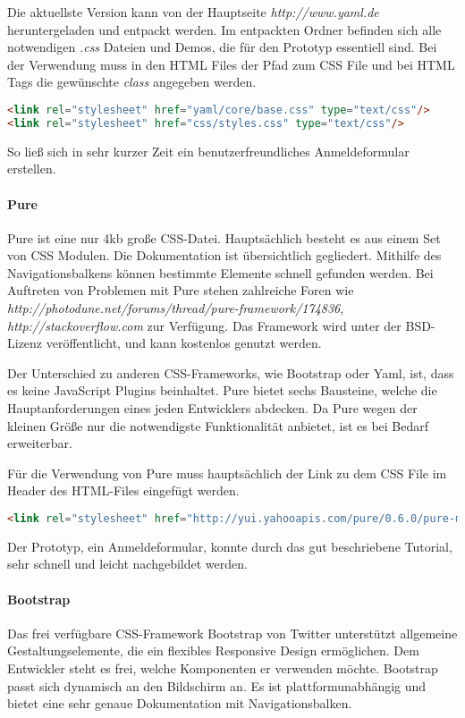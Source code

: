 Die aktuellste Version kann von der Hauptseite \textit{http://www.yaml.de} heruntergeladen und entpackt werden. Im entpackten Ordner befinden sich alle notwendigen \textit{.css} Dateien und Demos, die für den Prototyp essentiell sind. Bei der Verwendung muss in den HTML Files der Pfad zum CSS File und bei HTML Tags die gewünschte \textit{class} angegeben werden. 
\begin{lstlisting}[caption={YAML einbinden \cite{YAMLPROTO}}, language=HTML]
<link rel="stylesheet" href="yaml/core/base.css" type="text/css"/>
<link rel="stylesheet" href="css/styles.css" type="text/css"/>
\end{lstlisting}

So ließ sich in sehr kurzer Zeit ein benutzerfreundliches Anmeldeformular erstellen.

\paragraph{Pure}
Pure ist eine nur 4kb große CSS-Datei. Hauptsächlich besteht es aus einem Set von CSS Modulen. Die Dokumentation ist übersichtlich gegliedert. Mithilfe des Navigationsbalkens können bestimmte Elemente schnell gefunden werden. Bei Auftreten von Problemen mit Pure stehen zahlreiche Foren wie \textit{http://photodune.net/forums/thread/pure-framework/174836}, \textit{http://stackoverflow.com} zur Verfügung. Das Framework wird unter der BSD-Lizenz veröffentlicht, und kann kostenlos genutzt werden. \cite{BSD}

Der Unterschied zu anderen CSS-Frameworks, wie Bootstrap oder Yaml, ist, dass es keine JavaScript Plugins beinhaltet. Pure bietet sechs Bausteine, welche die Hauptanforderungen eines jeden Entwicklers abdecken. Da Pure wegen der kleinen Größe nur die notwendigste Funktionalität anbietet, ist es bei Bedarf erweiterbar.

Für die Verwendung von Pure muss hauptsächlich der Link zu dem CSS File im Header des HTML-Files eingefügt werden. \cite{PURE}
\begin{lstlisting}[caption={Pure einbinden \cite{PURE}}, language=HTML]
<link rel="stylesheet" href="http://yui.yahooapis.com/pure/0.6.0/pure-min.css">
\end{lstlisting}

Der Prototyp, ein Anmeldeformular, konnte durch das gut beschriebene Tutorial, sehr schnell und leicht nachgebildet werden.

\paragraph{Bootstrap}
Das frei verfügbare CSS-Framework Bootstrap von Twitter unterstützt allgemeine Gestaltungselemente, die ein flexibles Responsive Design ermöglichen. Dem Entwickler steht es frei, welche Komponenten er verwenden möchte. Bootstrap passt sich dynamisch an den Bildschirm an. Es ist plattformunabhängig und bietet eine sehr genaue Dokumentation mit Navigationsbalken.

